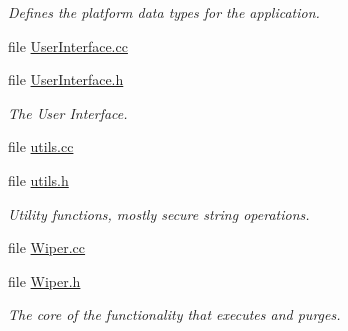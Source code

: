 \begin{DoxyCompactItemize}
\begin{DoxyCompactList}\small\item\em Defines the platform data types for the application. \end{DoxyCompactList}\item 
file \hyperlink{_user_interface_8cc}{User\-Interface.\-cc}
\item 
file \hyperlink{_user_interface_8h}{User\-Interface.\-h}
\begin{DoxyCompactList}\small\item\em The User Interface. \end{DoxyCompactList}\item 
file \hyperlink{utils_8cc}{utils.\-cc}
\item 
file \hyperlink{utils_8h}{utils.\-h}
\begin{DoxyCompactList}\small\item\em Utility functions, mostly secure string operations. \end{DoxyCompactList}\item 
file \hyperlink{_wiper_8cc}{Wiper.\-cc}
\item 
file \hyperlink{_wiper_8h}{Wiper.\-h}
\begin{DoxyCompactList}\small\item\em The core of the functionality that executes and purges. \end{DoxyCompactList}\end{DoxyCompactItemize}
